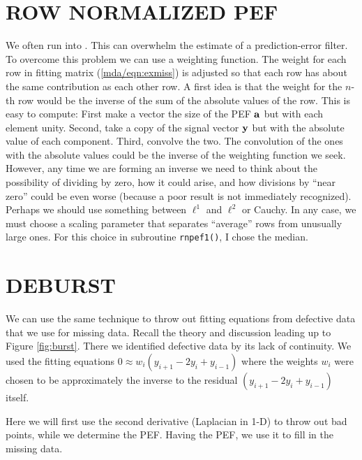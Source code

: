 \section{ROW NORMALIZED PEF}
We often run into .
This can overwhelm the estimate of a prediction-error filter.
To overcome this problem we can use a weighting function.
The weight for each row in fitting matrix
(\ref{mda/eqn:exmiss})
is adjusted so that each row has about the same
contribution as each other row.
A first idea is that the weight for the $n$-th row
would be the inverse of the sum of the absolute values of the row.
This is easy to compute:
First make a vector the size of the PEF $\bold a$ but with each element unity.
Second, take a copy of the signal vector $\bold y$
but with the absolute value of each component.
Third, convolve the two.
%
\noindent
The convolution of the ones with the absolute values
could be the inverse of the weighting function we seek.
However, any time we are forming an inverse we need to think
about the possibility of dividing by zero, how it could arise,
and how divisions by ``near zero'' could be even worse
(because a poor result is not immediately recognized).
Perhaps we should use something between $\ell^1$ and $\ell^2$ or Cauchy.
In any case, we must choose a scaling parameter
that separates ``average'' rows from unusually large ones.
For this choice in subroutine \texttt{rnpef1()}, I chose the median.


\section{DEBURST}
\par
We can use the same technique to throw out fitting equations
from defective data that we use for missing data.
Recall the theory and discussion leading up to 
Figure \ref{fig:burst}.
There we identified defective data by its lack
of continuity.  We used the fitting equations
$0\approx w_i (y_{i+1} -2y_i + y_{i-1})$
where the weights $w_i$ were chosen
to be approximately the inverse
to the residual $(y_{i+1} -2y_i + y_{i-1})$ itself.
\par
Here we will first use the second derivative
(Laplacian in 1-D) to throw out bad points,
while we determine the PEF.
Having the PEF, we use it to fill in the missing data.

